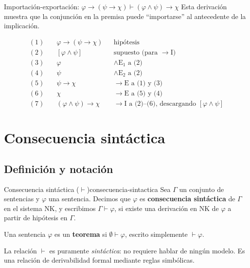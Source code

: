 \begin{ejemplo}{Importación-exportación: $\varphi \to (\psi \to \chi) \vdash (\varphi \wedge \psi) \to \chi$}{}
Esta derivación muestra que la conjunción en la premisa puede ``importarse'' al antecedente de la implicación.

\begin{align*}
(1)\quad &\varphi \to (\psi \to \chi) && \text{hipótesis} \\
(2)\quad &[\varphi \wedge \psi] && \text{supuesto (para }\to\mathrm{I}\text{)} \\
(3)\quad &\varphi && \wedge\mathrm{E}_1 \text{ a (2)} \\
(4)\quad &\psi && \wedge\mathrm{E}_2 \text{ a (2)} \\
(5)\quad &\psi \to \chi && \to\mathrm{E} \text{ a (1) y (3)} \\
(6)\quad &\chi && \to\mathrm{E} \text{ a (5) y (4)} \\
(7)\quad &(\varphi \wedge \psi) \to \chi && \to\mathrm{I} \text{ a (2)--(6), descargando }[\varphi\wedge\psi]
\end{align*}
\end{ejemplo}

\section{Consecuencia sintáctica}

\subsection{Definición y notación}

\begin{definicion}{Consecuencia sintáctica ($\vdash$)}{consecuencia-sintactica}
Sea $\Gamma$ un conjunto de sentencias y $\varphi$ una sentencia. Decimos que $\varphi$ es \textbf{consecuencia sintáctica} de $\Gamma$ en el sistema NK, y escribimos $\Gamma \vdash \varphi$, si existe una derivación en NK de $\varphi$ a partir de hipótesis en $\Gamma$.

Una sentencia $\varphi$ es un \textbf{teorema} si $\emptyset \vdash \varphi$, escrito simplemente $\vdash \varphi$.
\end{definicion}

La relación $\vdash$ es puramente \emph{sintáctica}: no requiere hablar de ningún modelo. Es una relación de derivabilidad formal mediante reglas simbólicas.


